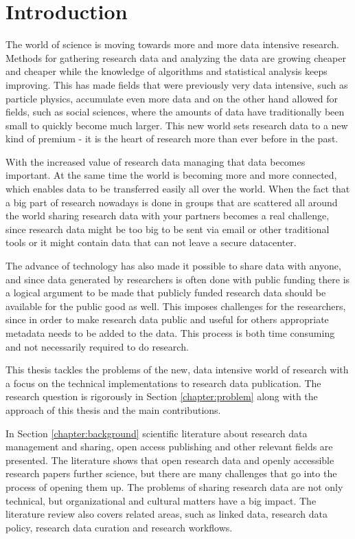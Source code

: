 \chapter{Introduction}
\label{chapter:intro}

The world of science is moving towards more and more data intensive research.
Methods for gathering research data and analyzing the data are growing
cheaper and cheaper while the knowledge of algorithms and statistical analysis
keeps improving. This has made fields that were previously very data intensive,
such as particle physics, accumulate even more data and on the other hand
allowed for fields, such as social sciences, where the amounts of data have
traditionally been small to quickly become much larger. This new world sets
research data to a new kind of premium - it is the heart of research more
than ever before in the past.

With the increased value of research data managing that data becomes important.
At the same time the world is becoming more and more connected, which enables
data to be transferred easily all over the world. When the fact that a big
part of research nowadays is done in groups that are scattered all around the
world sharing research data with your partners becomes a real challenge, since
research data might be too big to be sent via email or other traditional tools
or it might contain data that can not leave a secure datacenter.

The advance of technology has also made it possible to share data with anyone,
and since data generated by researchers is often done with public funding there
is a logical argument to be made that publicly funded research data should be
available for the public good as well. This imposes challenges for the
researchers, since in order to make research data public and useful for others
appropriate metadata needs to be added to the data. This process is both
time consuming and not necessarily required to do research.

This thesis tackles the problems of the new, data intensive world of research
with a focus on the technical implementations to research data publication.
The research question is rigorously in Section \ref{chapter:problem} along with
the approach of this thesis and the main contributions.

In Section \ref{chapter:background} scientific literature about research data
management and sharing, open access publishing and other relevant fields are
presented. The literature shows that open research data and openly accessible
research papers further science, but there are many challenges that go into
the process of opening them up. The problems of sharing research data are not
only technical, but organizational and cultural matters have a big impact. The
literature review also covers related areas, such as linked data, research
data policy, research data curation and research workflows.

